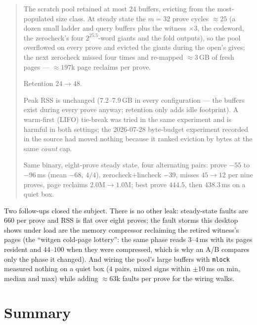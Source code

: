 \documentclass[11pt]{article}
\newcommand{\code}[1]{\texttt{#1}}
\newenvironment{optsummary}{%
  \begin{quote}\small
  \begin{description}
  \setlength{\itemsep}{1pt}\setlength{\parsep}{0pt}\setlength{\topsep}{2pt}
}{%
  \end{description}
  \end{quote}
}
\begin{document}
\begin{optsummary}
\item[Baseline:] The scratch pool retained at most $24$ buffers, evicting from the most-populated size class. At steady state the $m{=}32$ prove cycles $\approx25$ (a dozen small ladder and query buffers plus the witness $\times3$, the codeword, the zerocheck's four $2^{25.5}$-word giants and the fold outputs), so the pool overflowed on every prove and evicted the giants during the open's gives; the next zerocheck missed four times and re-mapped $\approx3\,$GB of fresh pages --- $\approx197$k page reclaims per prove.
\item[Improvement:] Retention $24\to48$.
\item[Mechanism:] Peak RSS is unchanged ($7.2$--$7.9\,$GB in every configuration --- the buffers exist during every prove anyway; retention only adds idle footprint). A warm-first (LIFO) tie-break was tried in the same experiment and is harmful in both settings; the 2026-07-28 byte-budget experiment recorded in the source had moved nothing because it ranked eviction by bytes at the same \emph{count} cap.
\item[Result:] Same binary, eight-prove steady state, four alternating pairs: prove $-55$ to $-96\,$ms (mean $-68$, $4/4$), zerocheck$+$lincheck $-39$, misses $45\to12$ per nine proves, page reclaims $2.0$M$\to1.0$M; best prove $444.5$, then $438.3\,$ms on a quiet box.
\end{optsummary}

Two follow-ups closed the subject. There is no other leak: steady-state
faults are $660$ per prove and RSS is flat over eight proves; the
fault storms this desktop shows under load are the memory compressor
reclaiming the retired witness's pages (the ``witgen cold-page
lottery'': the same phase reads $3$--$4\,$ms with its pages resident and
$44$--$100$ when they were compressed, which is why an A/B compares only
the phase it changed). And wiring the pool's large buffers with
\code{mlock} measured nothing on a quiet box ($4$ pairs, mixed signs
within $\pm10\,$ms on min, median and max) while adding $\approx63$k
faults per prove for the wiring walks.

\section*{Summary}
\end{document}
